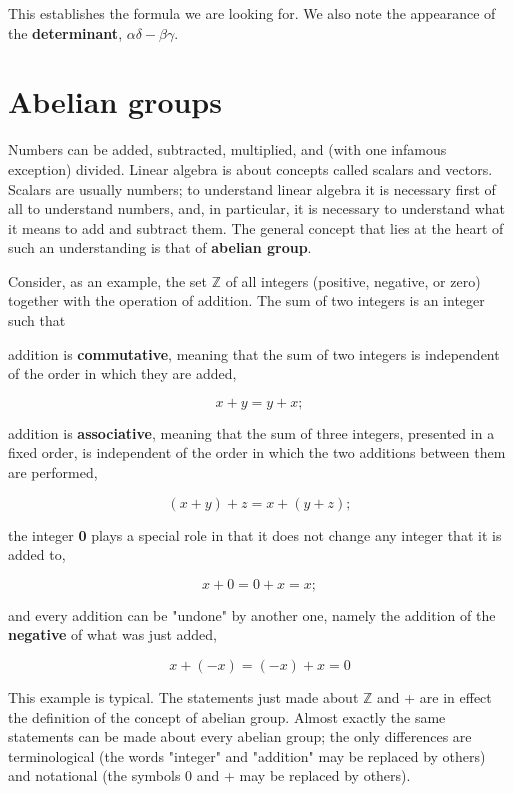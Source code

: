 This establishes the formula we are looking for. We also note the appearance of the \textbf{determinant}, $\alpha\delta - \beta\gamma$.

\section{Abelian groups}

Numbers can be added, subtracted, multiplied, and (with one infamous exception) divided. Linear algebra is about concepts called scalars and vectors. Scalars are usually numbers; to understand linear algebra it is necessary first of all to understand numbers, and, in particular, it is necessary to understand what it means to add and subtract them. The general concept that lies at the heart of such an understanding is that of \textbf{abelian group}.

Consider, as an example, the set $\mathbb{Z}$ of all integers (positive, negative, or zero) together with the operation of addition. The sum of two integers is an integer such that

\quad addition is \textbf{commutative}, meaning that the sum of two integers is independent of the order in which they are added,

\begin{equation}
    x + y = y + x;
\end{equation}

\quad addition is \textbf{associative}, meaning that the sum of three integers, presented in a fixed order, is independent of the order in which the two additions between them are performed,

\begin{equation}
    (x + y) + z = x + (y + z);
\end{equation}

\quad the integer \textbf{0} plays a special role in that it does not change any integer that it is added to,

\begin{equation}
    x + 0 = 0 + x = x;
\end{equation}

\quad and every addition can be "undone" by another one, namely the addition of the \textbf{negative} of what was just added,

\begin{equation}
    x + (-x) = (-x) + x = 0
\end{equation}

This example is typical. The statements just made about $\mathbb{Z}$ and + are in effect the definition of the concept of abelian group. Almost exactly the same statements can be made about every abelian group; the only differences are terminological (the words "integer" and "addition" may be replaced by others) and notational (the symbols 0 and + may be replaced by others).


